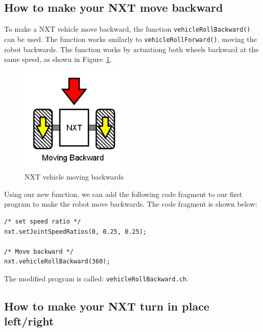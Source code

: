 \documentclass[11pt]{article}
\begin{document}
\subsection{How to make your NXT move backward}
To make a NXT vehicle move backward, the function {\tt vehicleRollBackward()} 
can be used. The function works smilarly to {\tt vehicleRollForward()}, moving 
the robot backwards. The function works by actuationg both wheels backward at 
the same speed, as shown in Figure~\ref{fig_NXT_backward}.\\
\begin{figure}[h]
  \begin{center}
    \includegraphics[height=2in]{figure/mindstorm/Vehicle_back.png}
    \caption{NXT vehicle moving backwards\label{fig_NXT_backward}}
  \end{center}
\end{figure}
Using our new function, we can add the following code fragment to our first 
program to make the robot move backwards. The code fragment is shown below:
\begin{lstlisting}
/* set speed ratio */
nxt.setJointSpeedRatios(0, 0.25, 0.25);

/* Move backward */
nxt.vehicleRollBackward(360);
\end{lstlisting}
The modified program is called: {\tt vehicleRollBackward.ch}.

\subsection{How to make your NXT turn in place left/right}
\end{document}
